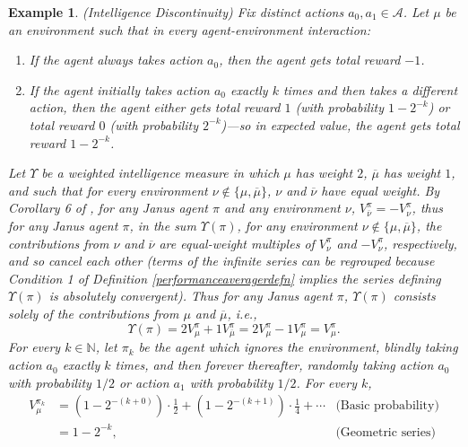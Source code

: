 \documentclass[twoside]{article}
\newtheorem{example}[theorem]{Example}
\begin{document}
\begin{example}
    (Intelligence Discontinuity)
    Fix distinct actions $a_0,a_1\in\mathcal A$.
    Let $\mu$ be an environment such that in every agent-environment interaction:
    \begin{enumerate}
        \item If the agent always takes action $a_0$, then the agent gets total reward $-1$.
        \item If the agent initially takes action $a_0$ exactly $k$ times and
            then takes a different action, then the agent either
            gets total reward $1$ (with probability $1-2^{-k}$)
            or total reward $0$ (with probability $2^{-k}$)---so in expected
            value, the agent gets total reward $1-2^{-k}$.
    \end{enumerate}
    Let $\Upsilon$ be a weighted intelligence measure in which $\mu$ has weight $2$,
    $\overline\mu$ has weight $1$, and such that for every
    environment $\nu\not\in\{\mu,\overline{\mu}\}$, $\nu$ and $\overline{\nu}$ have
    equal weight.
    By Corollary 6 of \cite{alexander2021reward}, for any Janus agent $\pi$ and
    any environment $\nu$, $V^\pi_{\overline\nu}=-V^\pi_{\nu}$, thus for any Janus agent $\pi$,
    in the sum $\Upsilon(\pi)$, for any environment $\nu\not\in\{\mu,\overline{\mu}\}$,
    the contributions from $\nu$ and $\overline\nu$ are equal-weight multiples of
    $V^\pi_{\nu}$ and $-V^\pi_{\nu}$,
    respectively, and so cancel each other
    (terms of the infinite series can be regrouped because
    Condition 1 of Definition \ref{performanceaveragerdefn} implies
    the series defining $\Upsilon(\pi)$ is absolutely convergent).
    Thus for any Janus agent $\pi$,
    $\Upsilon(\pi)$ consists solely of the contributions from $\mu$ and $\overline\mu$,
    i.e.,
    \[
        \Upsilon(\pi)=2V^\pi_\mu+1V^\pi_{\overline\mu}
        =2V^\pi_\mu-1V^\pi_{\mu}=V^\pi_\mu.
    \]
    For every $k\in\mathbb N$, let $\pi_k$ be the agent which ignores the environment,
    blindly taking action $a_0$ exactly $k$ times, and then forever thereafter,
    randomly taking action $a_0$ with probability $1/2$ or action $a_1$ with probability
    $1/2$.
    For every $k$,
    \begin{align*}
        V^{\pi_k}_\mu
            &= (1-2^{-(k+0)})\cdot \mbox{$\frac12$}
                +(1-2^{-(k+1)})\cdot\mbox{$\frac14$} + \cdots
                    &\mbox{(Basic probability)}\\
            &= 1-2^{-k},
                    &\mbox{(Geometric series)}

\end{align*}
\end{example}
\end{document}
